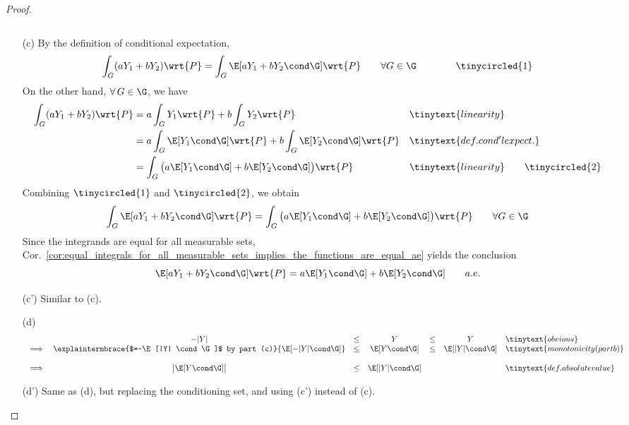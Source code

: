 \documentclass{article} %
\begin{document}
\begin{proof}
\begin{itemize}
\[\]
\item[(c)] 
By the definition 
of conditional expectation,
%
\[ \int_G (a Y_1 + b Y_2 ) \wrt{P} = \int_G \E[a Y_1 + b Y_2 \cond \G ]\wrt{P} \quad \quad \forall G \in \G \quad \quad \quad \quad \tinycircled{1} \]
On the other hand, $\forall \, G \in \G$, we have 
\begin{align*}
\int_G (a Y_1 + b Y_2 ) \wrt{P} &= a \int_G Y_1 \wrt{P} + b \int_G Y_2  \wrt{P}  && \tinytext{linearity} \\
&= a \int_G \E[Y_1 \cond \G] \wrt{P} + b \int_G \E[Y_2 \cond \G]  \wrt{P}  && \tinytext{def. cond'l expect.} \\
&= \int_G  \big( a\E[Y_1 \cond \G]  + b \E[Y_2 \cond \G]  \big) \wrt{P}  && \tinytext{linearity} \quad \quad \tinycircled{2} \\  
\end{align*}
Combining $\tinycircled{1}$ and $\tinycircled{2}$, we obtain
\[ \int_G \E[a Y_1 + b Y_2 \cond \G ]\wrt{P}  = \int_G  \big( a\E[Y_1 \cond \G]  + b \E[Y_2 \cond \G]  \big) \wrt{P} \quad \quad \forall G \in \G  \] 
Since the integrands are equal for all measurable sets,  Cor.~\ref{cor:equal_integrals_for_all_measurable_sets_implies_the_functions_are_equal_ae} yields the conclusion
\[ \E[a Y_1 + b Y_2 \cond \G ]\wrt{P}  =  a\E[Y_1 \cond \G]  + b \E[Y_2 \cond \G]   \quad \quad a.e.  \]
\item[(c')] Similar to (c).
\item[(d)]\footnotemark
\[\begin{array}{rcccccl}
& -|Y| &\leq & Y &\leq & Y &\tinytext{obvious} \\
\implies & \explaintermbrace{$=-\E[|Y| \cond \G]$ by part (c)}{\E[-|Y| \cond \G]} &\leq & \E[Y \cond \G]  &\leq & \E[|Y| \cond \G]  &\tinytext{monotonicity (part b)} \\
&&&&&&\\
 \implies & \big| \E[Y \cond \G] \big| &\leq & \E[|Y| \cond \G] & & & \tinytext{def. absolute value}
\end{array}\]
\item[(d')] Same as (d), but replacing the conditioning set, and using (c') instead of (c).
\end{itemize}
\end{proof}
\end{document}
